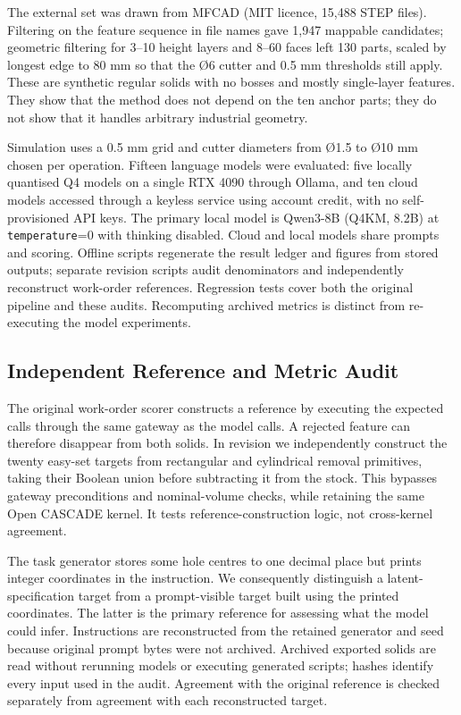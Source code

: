 The external set was drawn from MFCAD (MIT licence, 15,488 STEP files). Filtering on the feature sequence in file names gave 1,947 mappable candidates; geometric filtering for 3--10 height layers and 8--60 faces left 130 parts, scaled by longest edge to 80 mm so that the Ø6 cutter and 0.5 mm thresholds still apply. These are synthetic regular solids with no bosses and mostly single-layer features. They show that the method does not depend on the ten anchor parts; they do not show that it handles arbitrary industrial geometry.

Simulation uses a 0.5 mm grid and cutter diameters from Ø1.5 to Ø10 mm chosen per operation. Fifteen language models were evaluated: five locally quantised Q4 models on a single RTX 4090 through Ollama, and ten cloud models accessed through a keyless service using account credit, with no self-provisioned API keys. The primary local model is Qwen3-8B (Q4\textunderscore K\textunderscore M, 8.2B) \cite{Qwen3_2025} at \texttt{temperature}=0 with thinking disabled. Cloud and local models share prompts and scoring. Offline scripts regenerate the result ledger and figures from stored outputs; separate revision scripts audit denominators and independently reconstruct work-order references. Regression tests cover both the original pipeline and these audits. Recomputing archived metrics is distinct from re-executing the model experiments.

\subsection{Independent Reference and Metric Audit}

The original work-order scorer constructs a reference by executing the expected calls through the same gateway as the model calls. A rejected feature can therefore disappear from both solids. In revision we independently construct the twenty easy-set targets from rectangular and cylindrical removal primitives, taking their Boolean union before subtracting it from the stock. This bypasses gateway preconditions and nominal-volume checks, while retaining the same Open CASCADE kernel. It tests reference-construction logic, not cross-kernel agreement.

The task generator stores some hole centres to one decimal place but prints integer coordinates in the instruction. We consequently distinguish a latent-specification target from a prompt-visible target built using the printed coordinates. The latter is the primary reference for assessing what the model could infer. Instructions are reconstructed from the retained generator and seed because original prompt bytes were not archived. Archived exported solids are read without rerunning models or executing generated scripts; hashes identify every input used in the audit. Agreement with the original reference is checked separately from agreement with each reconstructed target.

